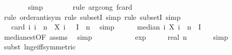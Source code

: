 \begin{isabellebody}
\ \ \ \ \ \ \isamarkupfalse%
\ {\isacharparenleft}{\kern0pt}simp{\isacharparenright}{\kern0pt}\isanewline
\ \ \ \ \ \ \isamarkupfalse%
\ {\isacharparenleft}{\kern0pt}rule\ arg{\isacharunderscore}{\kern0pt}cong{\isacharbrackleft}{\kern0pt}\ f{\isacharequal}{\kern0pt}{\isachardoublequoteopen}card{\isachardoublequoteclose}{\isacharbrackright}{\kern0pt}{\isacharparenright}{\kern0pt}\isanewline
\ \ \ \ \ \ \isamarkupfalse%
\ {\isacharparenleft}{\kern0pt}rule\ order{\isacharunderscore}{\kern0pt}antisym{\isacharcomma}{\kern0pt}\ rule\ subsetI{\isacharcomma}{\kern0pt}\ simp{\isacharcomma}{\kern0pt}\ rule\ subsetI{\isacharcomma}{\kern0pt}\ simp{\isacharparenright}{\kern0pt}\isanewline
\ \ \ \ \isamarkupfalse%
\ \isamarkupfalse%
\ {\isachardoublequoteopen}{}\ {\isacharasterisk}{\kern0pt}\ card\ {\isacharbraceleft}{\kern0pt}i{\isachardot}{\kern0pt}\ i\ {\isacharless}{\kern0pt}\ n\ {\isasymand}\ X\ i\ {\isasymomega}\ {\isasymin}\ I{\isacharbraceright}{\kern0pt}\ {\isachargreater}{\kern0pt}\ n{\isachardoublequoteclose}\ \isamarkupfalse%
\ simp\isanewline
\ \ \ \ \isamarkupfalse%
\ {\isachardoublequoteopen}median\ {\isacharparenleft}{\kern0pt}{\isasymlambda}i{\isachardot}{\kern0pt}\ X\ i\ {\isasymomega}{\isacharparenright}{\kern0pt}\ n\ {\isasymin}\ I{\isachardoublequoteclose}\isanewline
\ \ \ \ \ \ \isamarkupfalse%
\ median{\isacharunderscore}{\kern0pt}est{\isacharbrackleft}{\kern0pt}OF\ assms{\isacharparenleft}{\kern0pt}{}{\isacharparenright}{\kern0pt}{\isacharbrackright}{\kern0pt}\ \isamarkupfalse%
\ simp\isanewline
\ \ \isamarkupfalse%
\isanewline
\isanewline
\ \ \isamarkupfalse%
\ {\isachardoublequoteopen}{}\ {\isacharminus}{\kern0pt}\ {\isasymepsilon}\ {\isasymle}\ {}{\isacharminus}{\kern0pt}\ exp\ {\isacharparenleft}{\kern0pt}{\isacharminus}{\kern0pt}\ {\isacharparenleft}{\kern0pt}{}\ {\isacharasterisk}{\kern0pt}\ {\isasymalpha}\ {\isacharasterisk}{\kern0pt}\ real\ n{\isacharparenright}{\kern0pt}{\isacharparenright}{\kern0pt}{\isachardoublequoteclose}\ \isanewline
\ \ \ \ \isamarkupfalse%
\ simp\isanewline
\ \ \ \ \isamarkupfalse%
\ {\isacharparenleft}{\kern0pt}subst\ ln{\isacharunderscore}{\kern0pt}ge{\isacharunderscore}{\kern0pt}iff{\isacharbrackleft}{\kern0pt}symmetric{\isacharbrackright}{\kern0pt}{\isacharparenright}{\kern0pt}\isanewline

\end{isabellebody}
